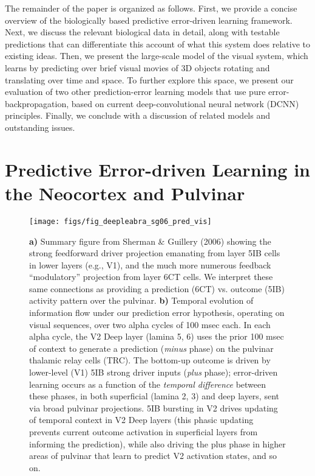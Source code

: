 \documentclass[11pt,twoside]{article}
\newif\myifpdf
\begin{document}
The remainder of the paper is organized as follows.  First, we provide a concise overview of the biologically based predictive error-driven learning framework.  Next, we discuss the relevant biological data in detail, along with testable predictions that can differentiate this account of what this system does relative to existing ideas.  Then, we present the large-scale model of the visual system, which learns by predicting over brief visual movies of 3D objects rotating and translating over time and space.  To further explore this space, we present our evaluation of two other prediction-error learning models that use pure error-backpropagation, based on current deep-convolutional neural network (DCNN) principles.  Finally, we conclude with a discussion of related models and outstanding issues.

\section{Predictive Error-driven Learning in the Neocortex and Pulvinar}

\begin{figure}
  \centering\texttt{[image: figs/fig\_deepleabra\_sg06\_pred\_vis]}
  \caption{{\bf a)} Summary figure from Sherman \& Guillery (2006) showing the strong feedforward driver projection emanating from layer 5IB cells in lower layers (e.g., V1), and the much more numerous feedback ``modulatory'' projection from layer 6CT cells.  We interpret these same connections as providing a prediction (6CT) vs. outcome (5IB) activity pattern over the pulvinar.  {\bf b)} Temporal evolution of information flow under our prediction error hypothesis, operating on visual sequences, over two alpha cycles of 100 msec each.  In each alpha cycle, the V2 Deep layer (lamina 5, 6) uses the prior 100 msec of context to generate a prediction (\emph{minus} phase) on the pulvinar thalamic relay cells (TRC). The bottom-up outcome is driven by lower-level (V1) 5IB strong driver inputs (\emph{plus} phase); error-driven learning occurs as a function of the \emph{temporal difference} between these phases, in both superficial (lamina 2, 3) and deep layers, sent via broad pulvinar projections. 5IB bursting in V2 drives updating of temporal context in V2 Deep layers (this phasic updating prevents current outcome activation in superficial layers from informing the prediction), while also driving the plus phase in higher areas of pulvinar that learn to predict V2 activation states, and so on.}
  \label{fig.sg06}
\end{figure}
\end{document}
